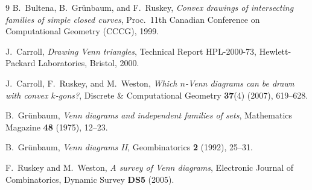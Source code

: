\documentclass[11pt]{article}
\begin{document}
\begin{thebibliography}{9}
B.~Bultena, B.~Gr\"unbaum, and F.~Ruskey,
\emph{Convex drawings of intersecting families of simple closed curves},
Proc.\ 11th Canadian Conference on Computational Geometry (CCCG), 1999.

J.~Carroll,
\emph{Drawing Venn triangles},
Technical Report HPL-2000-73, Hewlett-Packard Laboratories, Bristol, 2000.

J.~Carroll, F.~Ruskey, and M.~Weston,
\emph{Which $n$-Venn diagrams can be drawn with convex $k$-gons?},
Discrete \& Computational Geometry \textbf{37}(4) (2007), 619--628.

B.~Gr\"unbaum,
\emph{Venn diagrams and independent families of sets},
Mathematics Magazine \textbf{48} (1975), 12--23.

B.~Gr\"unbaum,
\emph{Venn diagrams II},
Geombinatorics \textbf{2} (1992), 25--31.

F.~Ruskey and M.~Weston,
\emph{A survey of Venn diagrams},
Electronic Journal of Combinatorics, Dynamic Survey \textbf{DS5} (2005).
\end{thebibliography}
\end{document}
